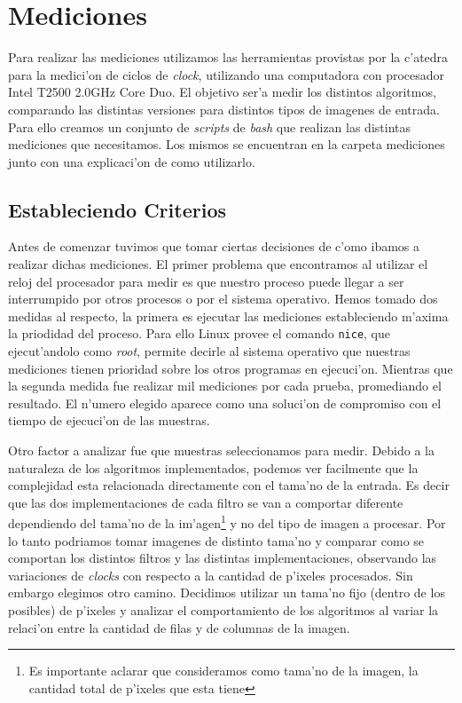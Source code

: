 \section{Mediciones}
\label{sec:mediciones}
Para realizar las mediciones utilizamos las herramientas provistas por la c'atedra para la medici'on de ciclos de \textit{clock}, utilizando una computadora con procesador Intel T2500 2.0GHz Core Duo. El objetivo ser'a medir los distintos algoritmos, comparando las distintas versiones para distintos tipos de imagenes de entrada. Para ello creamos un conjunto de \textit{scripts} de \textit{bash} que realizan las distintas mediciones que necesitamos. Los mismos se encuentran en la carpeta mediciones junto con una explicaci'on de como utilizarlo.

\subsection{Estableciendo Criterios}

Antes de comenzar tuvimos que tomar ciertas decisiones de c'omo ibamos a realizar dichas mediciones. El primer problema que encontramos al utilizar el reloj del procesador para medir es que nuestro proceso puede llegar a ser interrumpido por otros procesos o por el sistema operativo. Hemos tomado dos medidas al respecto, la primera es ejecutar las mediciones estableciendo m'axima la priodidad del proceso. Para ello Linux provee el comando \texttt{nice}, que ejecut'andolo como \textit{root}, permite decirle al sistema operativo que nuestras mediciones tienen prioridad sobre los otros programas en ejecuci'on. 
Mientras que la segunda medida fue realizar mil mediciones por cada prueba, promediando el resultado. El n'umero elegido aparece como una soluci'on de compromiso con el tiempo de ejecuci'on de las muestras.

Otro factor a analizar fue que muestras seleccionamos para medir. Debido a la naturaleza de los algoritmos implementados, podemos ver facilmente que la complejidad esta relacionada directamente con el tama'no de la entrada. Es decir que las dos implementaciones de cada filtro se van a comportar diferente dependiendo del tama'no de la im'agen\footnote{Es importante aclarar que consideramos como tama'no de la imagen, la cantidad total de p'ixeles que esta tiene} y no del tipo de imagen a procesar. Por lo tanto podriamos tomar imagenes de distinto tama'no y comparar como se comportan los distintos filtros y las distintas implementaciones, observando las variaciones de \textit{clocks} con respecto a la cantidad de p'ixeles procesados. Sin embargo elegimos otro camino. Decidimos utilizar un tama'no fijo (dentro de los posibles) de p'ixeles y analizar el comportamiento de los algoritmos al variar la relaci'on entre la cantidad de filas y de columnas de la imagen. 

